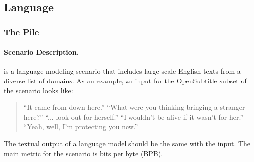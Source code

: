 

\subsection{Language}
\label{app:component-language}

\subsubsection{The Pile}
\paragraph{Scenario Description.}
\pile \citep{gao2021thepile} is a language modeling scenario that includes large-scale English texts from a diverse list of domains. As an example, an input for the OpenSubtitle \citep{tiedemann-2016-finding} subset of the scenario looks like: 
\begin{quote}
``It came from down here.'' ``What were you thinking bringing a stranger here?'' ``... look out for herself.'' ``I wouldn't be alive if it wasn't for her.'' ``Yeah, well, I'm protecting you now.''
\end{quote}
The textual output of a language model should be the same with the input. The main metric for the scenario is bits per byte (BPB).


